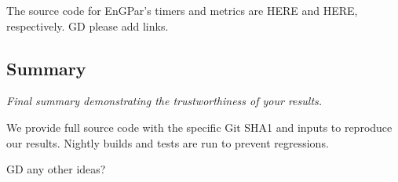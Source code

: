 The source code for EnGPar's timers and metrics are HERE and HERE, respectively.
{\color{red} GD please add links}.

\subsection{Summary}

{\em Final summary demonstrating the trustworthiness of your results.}

We provide full source code with the specific Git SHA1 and inputs to reproduce
our results.
Nightly builds and tests are run to prevent regressions.

{\color{red} GD any other ideas?}
